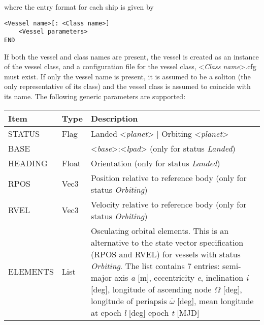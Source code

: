 \documentclass[Orbiter Developer Manual.tex]{subfiles}
\begin{document}
\noindent
where the entry format for each ship is given by

\begin{lstlisting}[language=OSFS]
<Vessel name>[: <Class name>]
	<Vessel parameters>
END
\end{lstlisting}

\noindent
If both the vessel and class names are present, the vessel is created as an instance of the vessel class, and a configuration file for the vessel class, <\textit{Class name}>.cfg must exist. If only the vessel name is present, it is assumed to be a soliton (the only representative of its class) and the vessel class is assumed to coincide with its name.
The following generic parameters are supported:

\begin{table}[H]
	\centering
	\begin{tabularx}{\textwidth}{ |l|l|X| }
	\hline\rule{0pt}{2ex}
	\textbf{Item} & \textbf{Type} & \textbf{Description}\\
	\hline\rule{0pt}{2ex}
	STATUS & Flag & Landed <\textit{planet}> | Orbiting <\textit{planet}>\\
	\hline\rule{0pt}{2ex}
	BASE &  & <\textit{base}>:<\textit{lpad}> (only for status \textit{Landed})\\
	\hline\rule{0pt}{2ex}
	HEADING & Float & Orientation (only for status \textit{Landed})\\
	\hline\rule{0pt}{2ex}
	RPOS & Vec3 & Position relative to reference body (only for status \textit{Orbiting})\\
	\hline\rule{0pt}{2ex}
	RVEL & Vec3 & Velocity relative to reference body (only for status \textit{Orbiting})\\
	\hline\rule{0pt}{2ex}
	ELEMENTS & List & Osculating orbital elements. This is an alternative to the state vector specification (RPOS and RVEL) for vessels with status \textit{Orbiting}. The list contains 7 entries:\newline
	semi-major axis \textit{a} [m],\newline
	eccentricity \textit{e},\newline
	inclination \textit{i} [deg],\newline
	longitude of ascending node $\Omega$ [deg],\newline
	longitude of periapsis $\overline{\omega}$ [deg],\newline
	mean longitude at epoch \textit{l} [deg]\newline
	epoch \textit{t} [MJD]\\

\end{tabularx}
\end{table}
\end{document}
